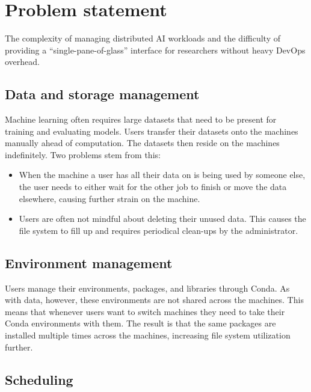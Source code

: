 \section{Problem statement}

The complexity of managing distributed AI workloads and the difficulty of providing a ``single-pane-of-glass'' interface for researchers without heavy DevOps overhead.

\subsection{Data and storage management}

Machine learning often requires large datasets that need to be present for training and evaluating models. Users transfer their datasets onto the machines manually ahead of computation. The datasets then reside on the machines indefinitely. Two problems stem from this:

\begin{itemize}
    \item When the machine a user has all their data on is being used by someone else, the user needs to either wait for the other job to finish or move the data elsewhere, causing further strain on the machine.
    \item Users are often not mindful about deleting their unused data. This causes the file system to fill up and requires periodical clean-ups by the administrator.
\end{itemize}

\subsection{Environment management}

Users manage their environments, packages, and libraries through Conda. As with data, however, these environments are not shared across the machines. This means that whenever users want to switch machines they need to take their Conda environments with them. The result is that the same packages are installed multiple times across the machines, increasing file system utilization further.


\subsection{Scheduling}

